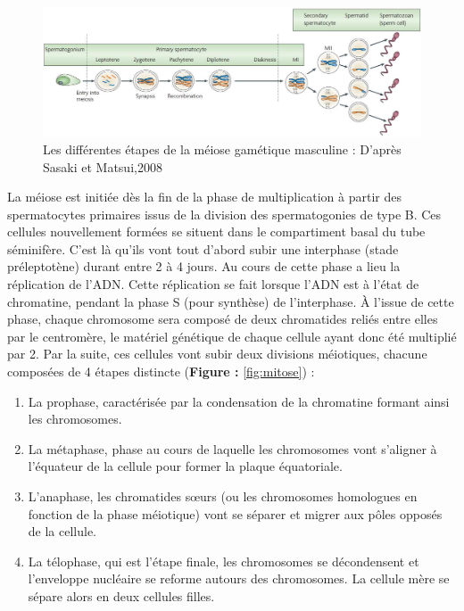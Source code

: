 \documentclass[12pt,twoside]{reedthesis}
\providecommand{\tightlist}{%
  \setlength{\itemsep}{0pt}\setlength{\parskip}{0pt}}
\theoremstyle{definition}
\theoremstyle{definition}
\theoremstyle{remark}
\begin{document}
  \begin{figure}
  
  {\centering \includegraphics[scale=0.35]{figure/Meiosis_Stages} 
  
  }
  
  \caption[Les différentes étapes de la méiose gamétique masculine]{Les différentes étapes de la méiose gamétique masculine : D’après Sasaki et Matsui,2008}\label{fig:meiose}
  \end{figure}
  
  La méiose est initiée dès la fin de la phase de multiplication à partir
  des spermatocytes primaires issus de la division des spermatogonies de
  type B. Ces cellules nouvellement formées se situent dans le
  compartiment basal du tube séminifère. C'est là qu'ils vont tout d'abord
  subir une interphase (stade préleptotène) durant entre 2 à 4 jours. Au
  cours de cette phase a lieu la réplication de l'ADN. Cette réplication
  se fait lorsque l'ADN est à l'état de chromatine, pendant la phase S
  (pour synthèse) de l'interphase. À l'issue de cette phase, chaque
  chromosome sera composé de deux chromatides reliés entre elles par le
  centromère, le matériel génétique de chaque cellule ayant donc été
  multiplié par 2. Par la suite, ces cellules vont subir deux divisions
  méiotiques, chacune composées de 4 étapes distincte (\textbf{Figure :
  }\ref{fig:mitose}) :
  
  \begin{enumerate}
  \def\labelenumi{\arabic{enumi}.}
  \tightlist
  \item
    La prophase, caractérisée par la condensation de la chromatine formant
    ainsi les chromosomes.\\
  \item
    La métaphase, phase au cours de laquelle les chromosomes vont
    s'aligner à l'équateur de la cellule pour former la plaque
    équatoriale.
  \item
    L'anaphase, les chromatides sœurs (ou les chromosomes homologues en
    fonction de la phase méiotique) vont se séparer et migrer aux pôles
    opposés de la cellule.\\
  \item
    La télophase, qui est l'étape finale, les chromosomes se décondensent
    et l'enveloppe nucléaire se reforme autours des chromosomes. La
    cellule mère se sépare alors en deux cellules filles.
  \end{enumerate}
  
\end{document}

